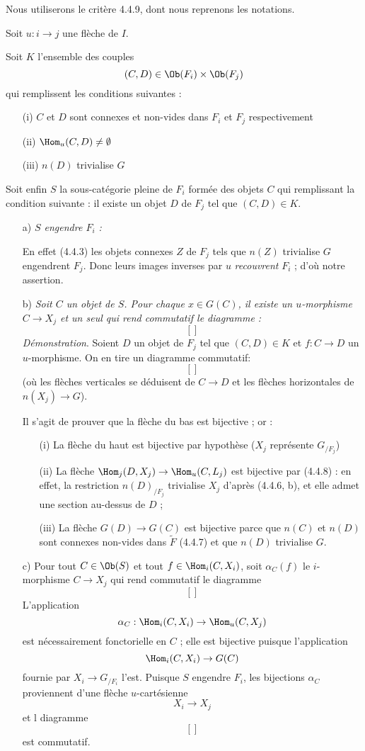 Nous utiliserons le critère 4.4.9, dont nous reprenons les notations.

Soit $u: i \to j$ une flèche de $I$.

Soit $K$ l'ensemble des couples
$$
(C, D) \in \Ob(F_i) \times \Ob(F_j)
$$
qui remplissent les conditions suivantes :
\begin{enumerate}
    \item[(i)] $C$ et $D$ sont connexes et non-vides dans $F_i$ et $F_j$ respectivement
    \item[(ii)] $\Hom_u(C,D) \neq \emptyset$
    \item[(iii)] $n(D)$ trivialise $G$
\end{enumerate}
Soit enfin $S$ la sous-catégorie pleine de $F_i$ formée des objets $C$ qui remplissant la condition suivante : il existe un objet $D$ de $F_j$ tel que $(C, D) \in K$.
\begin{enumerate}
    \item[a)] \emph{$S$ engendre $F_i$ :}
    
    En effet (4.4.3) les objets connexes $Z$ de $F_j$ tels que $n(Z)$ trivialise $G$ engendrent $F_j$. Donc leurs images inverses par $u$ \emph{recouvrent} $F_i$ ; d'où notre assertion.
    \item[b)] \emph{Soit $C$ un objet de $S$. Pour chaque $x \in G(C)$, il existe un $u$-morphisme $C \to X_j$ et un seul qui rend commutatif le diagramme :}
    $$
    []
    $$
    {\it Démonstration}. Soient $D$ un objet de $F_j$ tel que $(C, D) \in K$ et $f: C \to D$ un $u$-morphisme. On en tire un diagramme commutatif:
$$
[]
$$
(où les flèches verticales se déduisent de $C \to D$ et les flèches horizontales de $n(X_j) \to G$).

Il s'agit de prouver que la flèche du bas est bijective ; or :
\begin{enumerate}
    \item[(i)] La flèche du haut est bijective par hypothèse ($X_j$ représente $G_{/F_j}$)
    \item[(ii)] La flèche $\Hom_j(D, X_j) \to \Hom_u(C, L_j)$ est bijective par (4.4.8) : en effet, la restriction $n(D)_{/F_j}$ trivialise $X_j$ d'après (4.4.6, b), et elle admet une section au-dessus de $D$ ;
    \item[(iii)] La flèche $G(D) \to G(C)$ est bijective parce que $n(C)$ et $n(D)$ sont connexes non-vides dans $\widetilde{F}$ (4.4.7) et que $n(D)$ trivialise $G$.
\end{enumerate}
    \item[c)] Pour tout $C \in \Ob(S)$ et tout $f \in \Hom_i(C, X_i)$, soit $\alpha_C(f)$ le $i$-morphisme $C \to X_j$ qui rend commutatif le diagramme
    $$
    []
    $$
    L'application 
    $$
    \alpha_C: \Hom_i(C, X_i) \to \Hom_u(C, X_j)
    $$
    est nécessairement fonctorielle en $C$ ; elle est bijective puisque l'application
    $$
    \Hom_i(C, X_i) \to G(C)
    $$
    fournie par $X_i \to G_{/F_i}$ l'est. Puisque $S$ engendre $F_i$, les bijections $\alpha_C$ proviennent d'une flèche $u$-cartésienne
    $$
    X_i \to X_j
    $$
    et l diagramme
    $$
    []
    $$
    est commutatif.
\end{enumerate}

